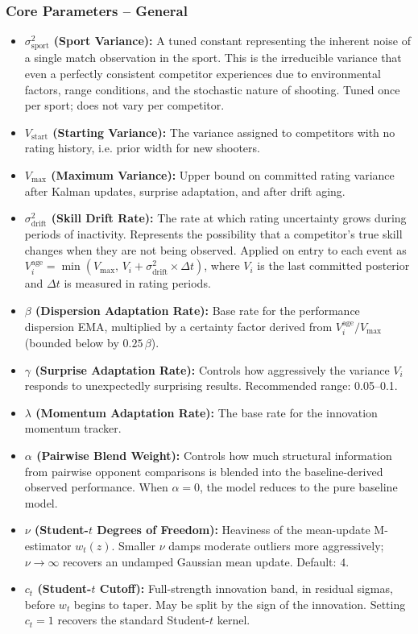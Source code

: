 \documentclass[12pt]{article}
\newcommand{\nudof}{\nu}       %
\newcommand{\ctcut}{c_t}       %
\begin{document}
	\subsubsection*{Core Parameters -- General}
	\begin{itemize}
		\item \textbf{$\sigma_{\mathrm{sport}}^2$ (Sport Variance):} A tuned constant representing the inherent noise of a single match observation in the sport. This is the irreducible variance that even a perfectly consistent competitor experiences due to environmental factors, range conditions, and the stochastic nature of shooting. Tuned once per sport; does not vary per competitor.
		\item \textbf{$V_{\mathrm{start}}$ (Starting Variance):} The variance assigned to competitors with no rating history, i.e. prior width for new shooters.
		\item \textbf{$V_{\max}$ (Maximum Variance):} Upper bound on committed rating variance after Kalman updates, surprise adaptation, and after drift aging.
		\item \textbf{$\sigma_{\mathrm{drift}}^2$ (Skill Drift Rate):} The rate at which rating uncertainty grows during periods of inactivity. Represents the possibility that a competitor's true skill changes when they are not being observed. Applied on entry to each event as $V_i^{\mathrm{age}} = \min(V_{\max},\, V_i + \sigma_{\mathrm{drift}}^2 \times \Delta t)$, where $V_i$ is the last committed posterior and $\Delta t$ is measured in rating periods.
		\item \textbf{$\beta$ (Dispersion Adaptation Rate):} Base rate for the performance dispersion EMA, multiplied by a certainty factor derived from $V_i^{\mathrm{age}}/V_{\max}$ (bounded below by $0.25\,\beta$).
		\item \textbf{$\gamma$ (Surprise Adaptation Rate):} Controls how aggressively the variance $V_i$ responds to unexpectedly surprising results. Recommended range: 0.05--0.1.
		\item \textbf{$\lambda$ (Momentum Adaptation Rate):} The base rate for the innovation momentum tracker.
		\item \textbf{$\alpha$ (Pairwise Blend Weight):} Controls how much structural information from pairwise opponent comparisons is blended into the baseline-derived observed performance. When $\alpha = 0$, the model reduces to the pure baseline model.
		\item \textbf{$\nudof$ (Student-$t$ Degrees of Freedom):} Heaviness of the mean-update M-estimator \(w_t(z)\). Smaller \(\nudof\) damps moderate outliers more aggressively; \(\nudof \to \infty\) recovers an undamped Gaussian mean update. Default: \(4\).
		\item \textbf{$\ctcut$ (Student-$t$ Cutoff):} Full-strength innovation band, in residual sigmas, before \(w_t\) begins to taper. May be split by the sign of the innovation. Setting \(\ctcut = 1\) recovers the standard Student-$t$ kernel.
	\end{itemize}
\end{document}
